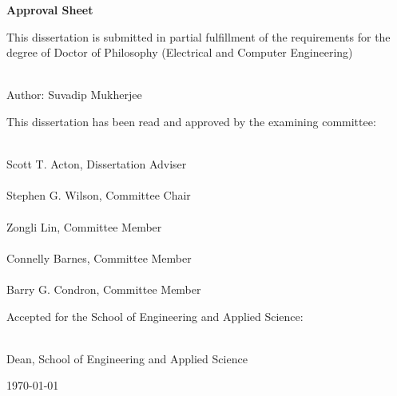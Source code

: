\begin{center}
\textbf{\Large Approval Sheet}
\end{center}

This dissertation is submitted in partial fulfillment of the requirements for the degree of
Doctor of Philosophy (Electrical and Computer Engineering) \\[0.5cm]
\begin{flushright}
	\begin{minipage}[c]{0.8\textwidth}
		\HRule \\[0.02cm] 
		Author: Suvadip Mukherjee
	\end{minipage}
\end{flushright}
This dissertation has been read and approved by the examining committee:\\[0.5cm]
\begin{flushright}
	\begin{minipage}[c]{0.8\textwidth}
		\HRule \\[0.02cm] 
		Scott T. Acton, Dissertation Adviser \\[0.3cm]
		
		\HRule \\[0.02cm] 
     	Stephen G. Wilson, Committee Chair \\[0.3cm]
     	
     	\HRule \\[0.02cm] 
     	Zongli Lin, Committee Member \\[0.3cm]
     	
     	\HRule \\[0.02cm] 
		Connelly Barnes, Committee Member \\[0.3cm]
 
      	\HRule \\[0.02cm] 
 		Barry G. Condron, Committee Member \\[0.3cm]
     	
	\end{minipage}
\end{flushright}

Accepted for the School of Engineering and Applied Science:\\[0.5cm]
\begin{flushright}
	\begin{minipage}[c]{0.8\textwidth}
		\HRule \\[0.02cm] 
		Dean, School of Engineering and Applied Science
	\end{minipage}
\end{flushright}
\begin{center}
\today
\end{center}
\vfill





